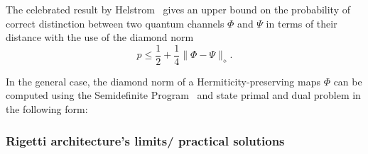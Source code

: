 \documentclass[preprint,12pt, a4paper]{elsarticle}
\newcommand{\1}{{\rm 1\hspace{-0.9mm}l}}
\newcommand{\Id}{{\rm 1\hspace{-0.9mm}l}}
\newcommand{\HH}{\mathcal{H}}
\begin{document}
The celebrated result by Helstrom~\cite{helstrom1976quantum} gives an upper
bound on the probability of correct distinction between two quantum channels
$\Phi$ and $\Psi$ in terms of their distance with the use of the diamond norm
\begin{equation}
p \leq \frac12 + \frac14 \| \Phi - \Psi \|_\diamond.
\end{equation}


In the general case, the diamond norm of a Hermiticity-preserving maps $\Phi$ can be computed using the Semidefinite Program~\cite{watrous2018theory} and state 
primal and dual problem in the following form:	

%


\subsubsection{Rigetti architecture's limits/ practical solutions}
\end{document}
